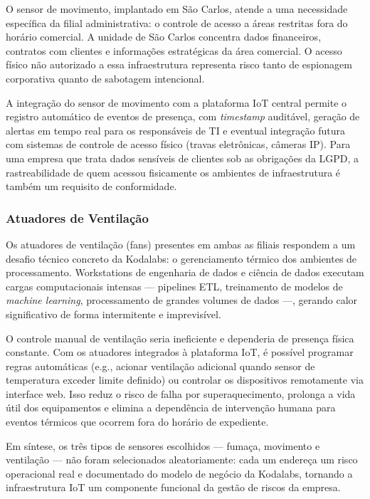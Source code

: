 O sensor de movimento, implantado em São Carlos, atende a uma necessidade
específica da filial administrativa: o controle de acesso a áreas restritas fora
do horário comercial. A unidade de São Carlos concentra dados financeiros,
contratos com clientes e informações estratégicas da área comercial. O acesso
físico não autorizado a essa infraestrutura representa risco tanto de espionagem
corporativa quanto de sabotagem intencional.

A integração do sensor de movimento com a plataforma IoT central permite o registro
automático de eventos de presença, com \textit{timestamp} auditável, geração de
alertas em tempo real para os responsáveis de TI e eventual integração futura com
sistemas de controle de acesso físico (travas eletrônicas, câmeras IP). Para uma
empresa que trata dados sensíveis de clientes sob as obrigações da LGPD, a
rastreabilidade de quem acessou fisicamente os ambientes de infraestrutura é
também um requisito de conformidade.

\subsubsection{Atuadores de Ventilação}

Os atuadores de ventilação (fans) presentes em ambas as filiais respondem a um
desafio técnico concreto da Kodalabs: o gerenciamento térmico dos ambientes de
processamento. Workstations de engenharia de dados e ciência de dados executam
cargas computacionais intensas — pipelines ETL, treinamento de modelos de
\textit{machine learning}, processamento de grandes volumes de dados —, gerando
calor significativo de forma intermitente e imprevisível.

O controle manual de ventilação seria ineficiente e dependeria de presença física
constante. Com os atuadores integrados à plataforma IoT, é possível programar
regras automáticas (e.g., acionar ventilação adicional quando sensor de temperatura
exceder limite definido) ou controlar os dispositivos remotamente via interface web.
Isso reduz o risco de falha por superaquecimento, prolonga a vida útil dos
equipamentos e elimina a dependência de intervenção humana para eventos térmicos
que ocorrem fora do horário de expediente.

Em síntese, os três tipos de sensores escolhidos — fumaça, movimento e ventilação —
não foram selecionados aleatoriamente: cada um endereça um risco operacional real
e documentado do modelo de negócio da Kodalabs, tornando a infraestrutura IoT um
componente funcional da gestão de riscos da empresa.

